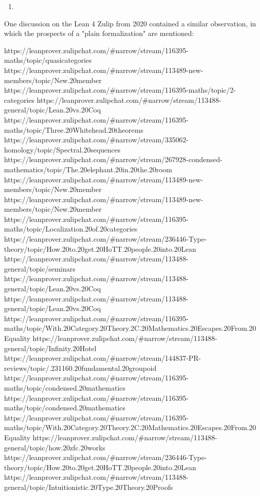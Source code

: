 \documentclass{book}
\begin{document}
\fi

\begin{enumerate}
\item 
\end{enumerate}


One discussion on the Lean 4 Zulip from 2020 contained a similar observation, in which the prospects of a "plain formalization" are mentioned:


https://leanprover.zulipchat.com/#narrow/stream/116395-maths/topic/quasicategories
https://leanprover.zulipchat.com/#narrow/stream/113489-new-members/topic/New.20member
https://leanprover.zulipchat.com/#narrow/stream/116395-maths/topic/2-categories
https://leanprover.zulipchat.com/#narrow/stream/113488-general/topic/Lean.20vs.20Coq
https://leanprover.zulipchat.com/#narrow/stream/116395-maths/topic/Three.20Whitehead.20theorems
https://leanprover.zulipchat.com/#narrow/stream/335062-homology/topic/Spectral.20sequences
https://leanprover.zulipchat.com/#narrow/stream/267928-condensed-mathematics/topic/The.20elephant.20in.20the.20room
https://leanprover.zulipchat.com/#narrow/stream/113489-new-members/topic/New.20member
https://leanprover.zulipchat.com/#narrow/stream/113489-new-members/topic/New.20member
https://leanprover.zulipchat.com/#narrow/stream/116395-maths/topic/Localization.20of.20categories
https://leanprover.zulipchat.com/#narrow/stream/236446-Type-theory/topic/How.20to.20get.20HoTT.20people.20into.20Lean
https://leanprover.zulipchat.com/#narrow/stream/113488-general/topic/seminars
https://leanprover.zulipchat.com/#narrow/stream/113488-general/topic/Lean.20vs.20Coq
https://leanprover.zulipchat.com/#narrow/stream/113488-general/topic/Lean.20vs.20Coq
https://leanprover.zulipchat.com/#narrow/stream/116395-maths/topic/With.20Category.20Theory.2C.20Mathematics.20Escapes.20From.20Equality
https://leanprover.zulipchat.com/#narrow/stream/113488-general/topic/Infinity.20Hotel
https://leanprover.zulipchat.com/#narrow/stream/144837-PR-reviews/topic/.231160.20fundamental.20groupoid
https://leanprover.zulipchat.com/#narrow/stream/116395-maths/topic/condensed.20mathematics
https://leanprover.zulipchat.com/#narrow/stream/116395-maths/topic/condensed.20mathematics
https://leanprover.zulipchat.com/#narrow/stream/116395-maths/topic/With.20Category.20Theory.2C.20Mathematics.20Escapes.20From.20Equality
https://leanprover.zulipchat.com/#narrow/stream/113488-general/topic/how.20zfc.20works
https://leanprover.zulipchat.com/#narrow/stream/236446-Type-theory/topic/How.20to.20get.20HoTT.20people.20into.20Lean
https://leanprover.zulipchat.com/#narrow/stream/113488-general/topic/Intuitionistic.20Type.20Theory.20Proofs
\end{document}
